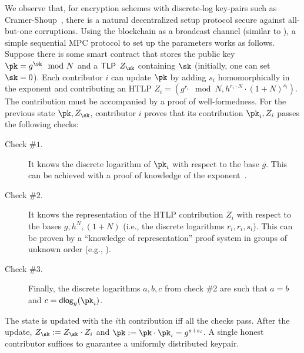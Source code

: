 


We observe that, for encryption schemes with discrete-log key-pairs such as Cramer-Shoup~\cite{C:CraSho98}, there is a natural decentralized setup protocol secure against all-but-one corruptions. Using the blockchain as a broadcast channel (similar to \cite{ACNS:NRBB24}), a simple sequential MPC protocol to set up the parameters works as follows. Suppose there is some smart contract that stores the public key $\pk=g^{\sk} \mod{N}$ and a $\mathsf{TLP}$ $Z_{\sk}$ containing $\sk$ (initially, one can set $\sk = 0$). Each contributor $i$ can update $\pk$ by adding $s_i$ homomorphically in the exponent and contributing an HTLP $Z_i=(g^{r_i}\mod{N},h^{r_i\cdot N}\cdot(1+N)^{s_i})$. The contribution must be accompanied by a proof of well-formedness. For the previous state $\pk, Z_{\sk}$, contributor $i$ proves that its contribution $\pk_i, Z_i$ passes the following checks:

\begin{description}
    \item[Check $\#1$.] It knows the discrete logarithm of $\pk_i$ with respect to the base $g$. This can be achieved with a proof of knowledge of the exponent~\cite{C:Schnorr89}.
    \item[Check $\#2$.]\label{item:check2} It knows the representation of the HTLP contribution $Z_i$ with respect to the bases $g, h^N, (1+N)$ (i.e., the discrete logarithms $r_i, r_i, s_i$). This can be proven by a ``knowledge of representation'' proof system in groups of unknown order (e.g., \cite{C:BonBunFis19}).
    \item[Check $\#3$.] Finally, the discrete logarithms $a,b,c$ from check \#2 are such that $a=b$ and $c={\sf dlog}_g(\pk_i)$.
\end{description}

The state is updated with the $i$th contribution iff all the checks pass. After the update, $Z_{\sk}:=Z_{\sk}\cdot Z_i$ and $\pk:=\pk\cdot \pk_i =g^{s+s_i}$. A single honest contributor suffices to guarantee a uniformly distributed keypair. 


